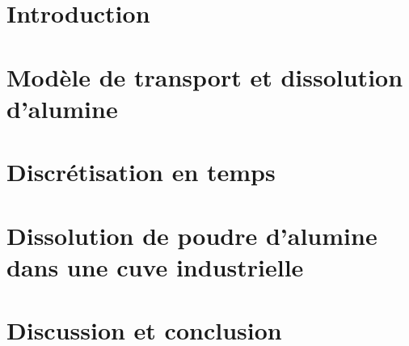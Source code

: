 \section{Introduction}
\label{sec:populations-introduction}


\section{Modèle de transport et dissolution d'alumine}
\label{sec:populations-model}


\section{Discrétisation en temps}
\label{sec:populations-discretisation}


\section[Dissolution d'alumine dans une cuve industrielle]{Dissolution de poudre d'alumine dans une cuve industrielle}
\label{sec:populations-industriel}


\section{Discussion et conclusion}
\label{sec:populations-conclusion}

